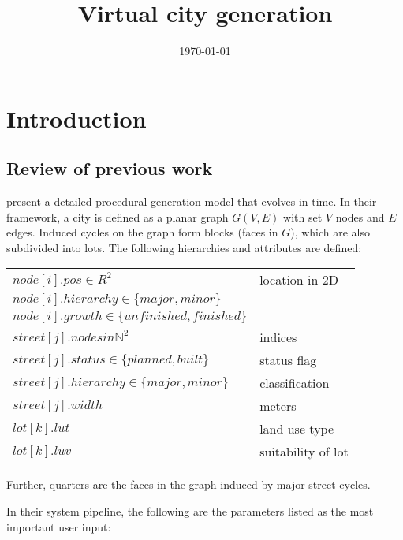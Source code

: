 \documentclass[11pt,twoside]{article}
\numberwithin{equation}{section}
\newcommand{\?}{\stackrel{?}{=}}
\begin{document}
\title{Virtual city generation}
\date{\small\today}
\maketitle

\thispagestyle{empty}

\tableofcontents
\section{Introduction} 

\subsection{Review of previous work}

\textcite{weber2009interactive} present a detailed procedural generation model that evolves in time.
In their framework, a city is defined as a planar graph $G(V,E)$ with set $V$ nodes and $E$ edges.
Induced cycles on the graph form blocks (faces in $G$), which are also subdivided into lots.
The following hierarchies and attributes are defined:

\begin{tabular}{l l }
  $node[i].pos \in R^2$ & location in 2D \\
  $node[i].hierarchy \in \{major, minor\}$ &  \\
  $node[i].growth \in \{unfinished, finished\}$ &  \\
  $street[j].nodes in \mathbb{N}^2$ & indices \\
  $street[j].status \in \{planned,built\}$ & status flag \\
  $street[j].hierarchy \in \{major,minor\}$ & classification \\
  $street[j].width$ & meters \\
  $lot[k].lut$ & land use type \\
  $lot[k].luv$ & suitability of lot \\
\end{tabular}

Further, quarters are the faces in the graph induced by major street cycles.

In their system pipeline, the following are the parameters listed as the most important user input:
\end{document}
